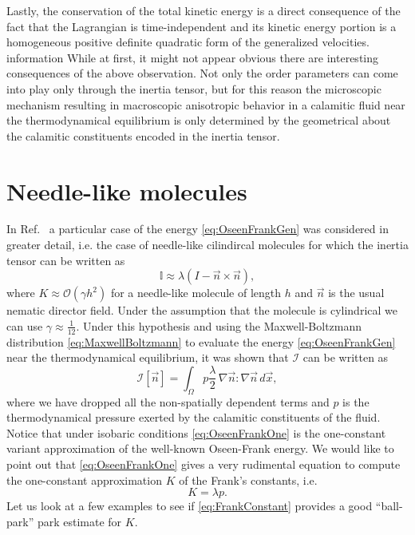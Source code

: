 \documentclass[%
 aip,
 amsmath,amssymb,
 reprint,%
]{revtex4-1}
\begin{document}
Lastly, the conservation of the total kinetic energy is a direct consequence of the fact that the Lagrangian is time-independent and its kinetic energy portion is a homogeneous positive definite quadratic form of the generalized velocities\cite{FM}.
information
While at first, it might not appear obvious there are interesting consequences of the above observation. Not only the order parameters can come into play only through the inertia tensor, but for this reason the microscopic mechanism resulting in macroscopic anisotropic behavior in a calamitic fluid near the thermodynamical equilibrium is only determined by the geometrical about the calamitic constituents encoded in the inertia tensor.
\section{Needle-like molecules}
In Ref.~ a particular case of the energy \eqref{eq:OseenFrankGen} was considered in greater detail, i.e. the case of needle-like cilindircal molecules for which the inertia tensor can be written as
\begin{equation}
  \label{eq:InertiaTensor}
  \mathbb{I} \approx \lambda(I-\vec{n}\times \vec{n}),
\end{equation}
where $K\approx \mathcal{O}(\gamma h^2)$ for a needle-like molecule of length $h$ and $\vec{n}$ is the usual nematic director field. Under the assumption that the molecule is cylindrical we can use $\gamma\approx \frac{1}{12}$.
Under this hypothesis and using the Maxwell-Boltzmann distribution \eqref{eq:MaxwellBoltzmann} to evaluate the energy \eqref{eq:OseenFrankGen} near the thermodynamical equilibrium, it was shown\cite{FRZ23} that $\mathcal{I}$ can be written as
\begin{equation}
  \label{eq:OseenFrankOne}
  \mathcal{I}[\vec{n}]=\int_\Omega p\frac{\lambda}{2}\,\nabla\vec{n}:\nabla\vec{n}\,d\vec{x},
\end{equation}
where we have dropped all the non-spatially dependent terms and $p$ is the thermodynamical pressure exerted by the calamitic constituents of the fluid. Notice that under isobaric conditions \eqref{eq:OseenFrankOne} is the one-constant variant approximation of the well-known Oseen-Frank energy\cite{V}.
We would like to point out that \eqref{eq:OseenFrankOne} gives a very rudimental equation to compute the one-constant approximation $K$ of the Frank's constants, i.e.
\begin{equation}
  \label{eq:FrankConstant}
  K=\lambda p.
\end{equation}
Let us look at a few examples to see if \eqref{eq:FrankConstant} provides a good ``ball-park'' park estimate for $K$.
\end{document}
